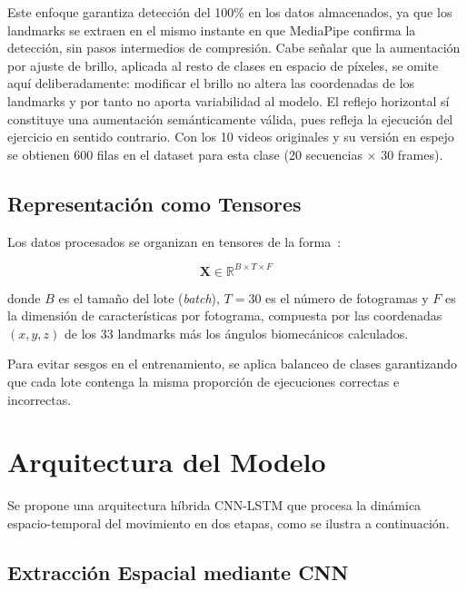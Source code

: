 \documentclass[conference]{IEEEtran}
\begin{document}
Este enfoque garantiza detección del 100\% en los datos almacenados,
ya que los landmarks se extraen en el mismo instante en que MediaPipe
confirma la detección, sin pasos intermedios de compresión. Cabe
señalar que la aumentación por ajuste de brillo, aplicada al resto
de clases en espacio de píxeles, se omite aquí deliberadamente:
modificar el brillo no altera las coordenadas de los landmarks y
por tanto no aporta variabilidad al modelo. El reflejo horizontal
sí constituye una aumentación semánticamente válida, pues refleja
la ejecución del ejercicio en sentido contrario. Con los 10 videos
originales y su versión en espejo se obtienen 600 filas en el
dataset para esta clase (20 secuencias $\times$ 30 frames).

\subsection{Representación como Tensores}

Los datos procesados se organizan en tensores de la
forma~\cite{w3schools_tensor}:

\begin{equation}
  \mathbf{X} \in \mathbb{R}^{B \times T \times F}
  \label{eq:tensor}
\end{equation}

donde $B$ es el tamaño del lote (\textit{batch}), $T = 30$ es el
número de fotogramas y $F$ es la dimensión de características por
fotograma, compuesta por las coordenadas $(x, y, z)$ de los 33
landmarks más los ángulos biomecánicos calculados.

Para evitar sesgos en el entrenamiento, se aplica balanceo de
clases garantizando que cada lote contenga la misma proporción
de ejecuciones correctas e incorrectas.

\section{Arquitectura del Modelo}
\label{sec:architecture}

Se propone una arquitectura híbrida CNN-LSTM que procesa la
dinámica espacio-temporal del movimiento en dos etapas, como
se ilustra a continuación.

\subsection{Extracción Espacial mediante CNN}
\end{document}

